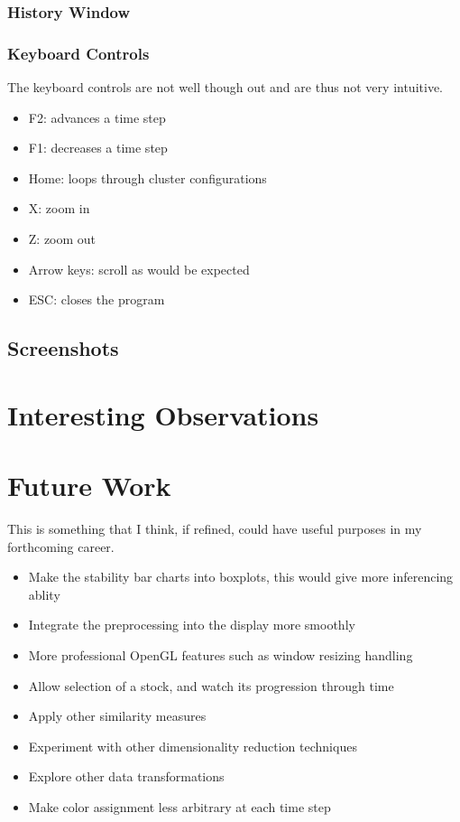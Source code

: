 \documentclass{article}
\begin{document}
\begin{multicols}{2}
\subsubsection{History Window}
\subsubsection{Keyboard Controls}
The keyboard controls are not well though out and are thus not very intuitive.

\begin{itemize}
	\item F2: advances a time step
	\item F1: decreases a time step
	\item Home: loops through cluster configurations
	\item X: zoom in
	\item Z: zoom out
	\item Arrow keys: scroll as would be expected
	\item ESC: closes the program
\end{itemize}

\subsection{Screenshots}


\section{Interesting Observations}

\section{Future Work}
This is something that I think, if refined, could have useful purposes in my forthcoming career.
\begin{itemize}
 \item Make the stability bar charts into boxplots, this would give more inferencing ablity
 \item Integrate the preprocessing into the display more smoothly
 \item More professional OpenGL features such as window resizing handling
 \item Allow selection of a stock, and watch its progression through time
 \item Apply other similarity measures
 \item Experiment with other dimensionality reduction techniques
 \item Explore other data transformations
 \item Make color assignment less arbitrary at each time step
\end{itemize}


\end{multicols}
\end{document}
